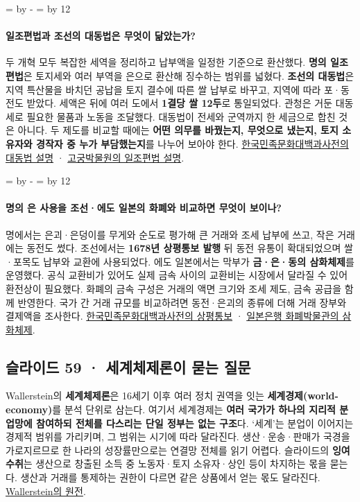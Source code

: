 \documentclass[10pt,a4paper]{article}
\newcommand{\ReserveQuestionSpace}{%
  \par\begingroup
  \dimen0=\pagegoal \advance\dimen0 by -\pagetotal
  \dimen2=\baselineskip \multiply\dimen2 by 12
  \ifdim\dimen0<\dimen2 \newpage\fi
  \endgroup}
\begin{document}
\ReserveQuestionSpace
\paragraph{일조편법과 조선의 대동법은 무엇이 닮았는가?}
두 개혁 모두 복잡한 세역을 정리하고 납부액을 일정한 기준으로 환산했다. \textbf{명의 일조편법}은 토지세와 여러 부역을 은으로 환산해 징수하는 범위를 넓혔다. \textbf{조선의 대동법}은 지역 특산물을 바치던 공납을 토지 결수에 따른 쌀 납부로 바꾸고, 지역에 따라 포·동전도 받았다. 세액은 뒤에 여러 도에서 \textbf{1결당 쌀 12두}로 통일되었다. 관청은 거둔 대동세로 필요한 물품과 노동을 조달했다. 대동법이 전세와 군역까지 한 세금으로 합친 것은 아니다. 두 제도를 비교할 때에는 \textbf{어떤 의무를 바꿨는지, 무엇으로 냈는지, 토지 소유자와 경작자 중 누가 부담했는지}를 나누어 보아야 한다. \href{https://encykorea.aks.ac.kr/Article/E0014246}{한국민족문화대백과사전의 대동법 설명} · \href{https://www.dpm.org.cn/lemmas/244780.html}{고궁박물원의 일조편법 설명}.\par

\ReserveQuestionSpace
\paragraph{명의 은 사용을 조선·에도 일본의 화폐와 비교하면 무엇이 보이나?}
명에서는 은괴·은덩이를 무게와 순도로 평가해 큰 거래와 조세 납부에 쓰고, 작은 거래에는 동전도 썼다. 조선에서는 \textbf{1678년 상평통보 발행} 뒤 동전 유통이 확대되었으며 쌀·포목도 납부와 교환에 사용되었다. 에도 일본에서는 막부가 \textbf{금·은·동의 삼화체제}를 운영했다. 공식 교환비가 있어도 실제 금속 사이의 교환비는 시장에서 달라질 수 있어 환전상이 필요했다. 화폐의 금속 구성은 거래의 액면 크기와 조세 제도, 금속 공급을 함께 반영한다. 국가 간 거래 규모를 비교하려면 동전·은괴의 종류에 더해 거래 장부와 결제액을 조사한다. \href{https://encykorea.aks.ac.kr/Article/E0027386}{한국민족문화대백과사전의 상평통보} · \href{https://www.imes.boj.or.jp/cm/english/?appsule=11}{일본은행 화폐박물관의 삼화체제}.\par

\subsection{슬라이드 59 · 세계체제론이 묻는 질문}
Wallerstein의 \textbf{세계체제론}은 16세기 이후 여러 정치 권역을 잇는 \textbf{세계경제(world-economy)}를 분석 단위로 삼는다. 여기서 세계경제는 \textbf{여러 국가가 하나의 지리적 분업망에 참여하되 전체를 다스리는 단일 정부는 없는 구조}다. ‘세계’는 분업이 이어지는 경제적 범위를 가리키며, 그 범위는 시기에 따라 달라진다. 생산·운송·판매가 국경을 가로지르므로 한 나라의 성장률만으로는 연결망 전체를 읽기 어렵다. 슬라이드의 \textbf{잉여 수취}는 생산으로 창출된 소득 중 노동자·토지 소유자·상인 등이 차지하는 몫을 묻는다. 생산과 거래를 통제하는 권한이 다르면 같은 상품에서 얻는 몫도 달라진다. \href{https://www.csub.edu/\%7Egsantos/WORLDSYS.HTML}{Wallerstein의 원전}.\par
\end{document}
